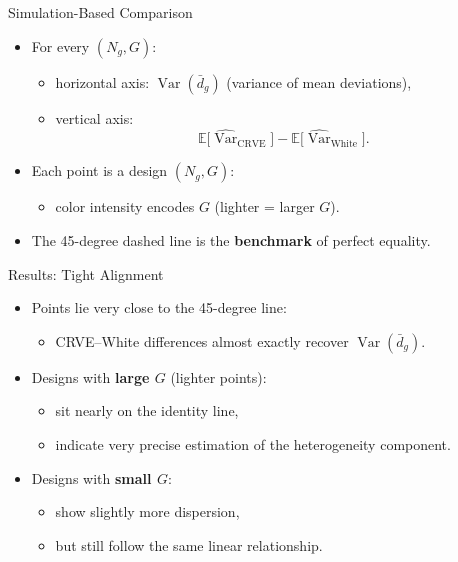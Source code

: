 \documentclass[
  ignorenonframetext,
]{beamer}
\providecommand{\tightlist}{%
  \setlength{\itemsep}{0pt}\setlength{\parskip}{0pt}}
\begin{document}
\begin{frame}{Simulation-Based Comparison}
\label{simulation-based-comparison}
\begin{itemize}
\tightlist
\item
  For every \((N_g, G)\):

  \begin{itemize}
  \tightlist
  \item
    horizontal axis: \(\operatorname{Var}(\bar d_g)\) (variance of mean
    deviations),
  \item
    vertical axis: \[
    \mathbb{E}\big[\widehat{\operatorname{Var}}_{\text{CRVE}}\big]
    -
    \mathbb{E}\big[\widehat{\operatorname{Var}}_{\text{White}}\big].
    \]
  \end{itemize}
\item
  Each point is a design \((N_g,G)\):

  \begin{itemize}
  \tightlist
  \item
    color intensity encodes \(G\) (lighter = larger \(G\)).
  \end{itemize}
\item
  The 45-degree dashed line is the \textbf{benchmark} of perfect
  equality.
\end{itemize}
\end{frame}

\begin{frame}{Results: Tight Alignment}
\label{results-tight-alignment}
\begin{itemize}
\tightlist
\item
  Points lie very close to the 45-degree line:

  \begin{itemize}
  \tightlist
  \item
    CRVE--White differences almost exactly recover
    \(\operatorname{Var}(\bar d_g)\).
  \end{itemize}
\item
  Designs with \textbf{large \(G\)} (lighter points):

  \begin{itemize}
  \tightlist
  \item
    sit nearly on the identity line,
  \item
    indicate very precise estimation of the heterogeneity component.
  \end{itemize}
\item
  Designs with \textbf{small \(G\)}:

  \begin{itemize}
  \tightlist
  \item
    show slightly more dispersion,
  \item
    but still follow the same linear relationship.
  \end{itemize}
\end{itemize}
\end{frame}
\end{document}
